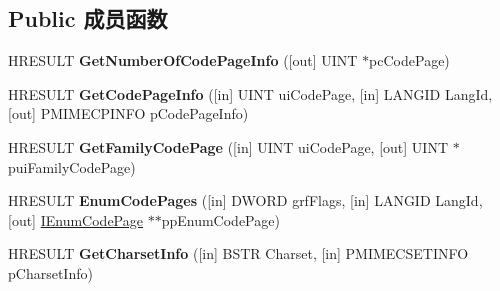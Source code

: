 \subsection*{Public 成员函数}
\begin{DoxyCompactItemize}
\item 
\mbox{\label{interface_multi_language_1_1_i_multi_language2_a158971041a89c77a4441d9d16b0128f0}} 
H\+R\+E\+S\+U\+LT {\bfseries Get\+Number\+Of\+Code\+Page\+Info} (\mbox{[}out\mbox{]} U\+I\+NT $\ast$pc\+Code\+Page)
\item 
\mbox{\label{interface_multi_language_1_1_i_multi_language2_a69603d1bbd65baf46a1492d1e601ad73}} 
H\+R\+E\+S\+U\+LT {\bfseries Get\+Code\+Page\+Info} (\mbox{[}in\mbox{]} U\+I\+NT ui\+Code\+Page, \mbox{[}in\mbox{]} L\+A\+N\+G\+ID Lang\+Id, \mbox{[}out\mbox{]} P\+M\+I\+M\+E\+C\+P\+I\+N\+FO p\+Code\+Page\+Info)
\item 
\mbox{\label{interface_multi_language_1_1_i_multi_language2_a26d951934daa3f78895f2f35259aa6db}} 
H\+R\+E\+S\+U\+LT {\bfseries Get\+Family\+Code\+Page} (\mbox{[}in\mbox{]} U\+I\+NT ui\+Code\+Page, \mbox{[}out\mbox{]} U\+I\+NT $\ast$pui\+Family\+Code\+Page)
\item 
\mbox{\label{interface_multi_language_1_1_i_multi_language2_a8c54f8499558e119f4c4a7ac4b3db0a3}} 
H\+R\+E\+S\+U\+LT {\bfseries Enum\+Code\+Pages} (\mbox{[}in\mbox{]} D\+W\+O\+RD grf\+Flags, \mbox{[}in\mbox{]} L\+A\+N\+G\+ID Lang\+Id, \mbox{[}out\mbox{]} \hyperlink{interface_multi_language_1_1_i_enum_code_page}{I\+Enum\+Code\+Page} $\ast$$\ast$pp\+Enum\+Code\+Page)
\item 
\mbox{\label{interface_multi_language_1_1_i_multi_language2_a9ee5a296c11447013311eea29aaed669}} 
H\+R\+E\+S\+U\+LT {\bfseries Get\+Charset\+Info} (\mbox{[}in\mbox{]} B\+S\+TR Charset, \mbox{[}in\mbox{]} P\+M\+I\+M\+E\+C\+S\+E\+T\+I\+N\+FO p\+Charset\+Info)
\item 
\mbox{\label{interface_multi_language_1_1_i_multi_language2_ab186cd0ca39146dad7eb51b1c8851f3d}} 
$$
\end{DoxyCompactItemize}
